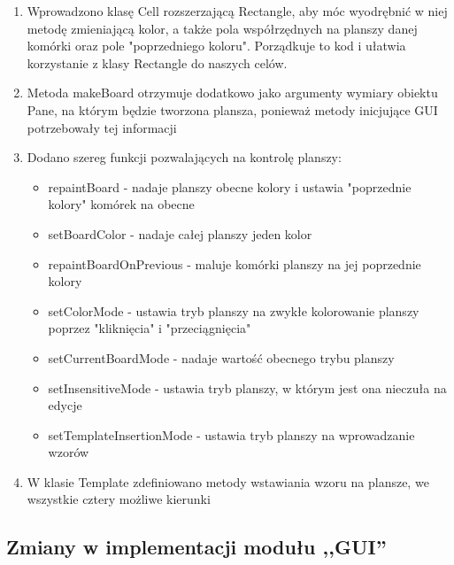 \documentclass[a4paper,11pt]{article}
\begin{document}
\begin{enumerate}
\item Wprowadzono klasę Cell rozszerzającą Rectangle, aby móc wyodrębnić w niej metodę zmieniającą kolor, a także pola współrzędnych na planszy danej komórki oraz pole "poprzedniego koloru". Porządkuje to kod i ułatwia korzystanie z klasy Rectangle do naszych celów.
\item Metoda makeBoard otrzymuje dodatkowo jako argumenty wymiary obiektu Pane, na którym będzie tworzona plansza, ponieważ metody inicjujące GUI potrzebowały tej informacji
\item Dodano szereg funkcji pozwalających na kontrolę planszy:
	\begin{itemize}
	\item repaintBoard - nadaje planszy obecne kolory i ustawia "poprzednie kolory" komórek na obecne
	\item setBoardColor - nadaje całej planszy jeden kolor
	\item repaintBoardOnPrevious - maluje komórki planszy na jej poprzednie kolory
	\item setColorMode - ustawia tryb planszy na zwykłe kolorowanie planszy poprzez "kliknięcia" i "przeciągnięcia"
	\item setCurrentBoardMode - nadaje wartość obecnego trybu planszy
	\item setInsensitiveMode - ustawia tryb planszy, w którym jest ona nieczuła na edycje
	\item setTemplateInsertionMode - ustawia tryb planszy na wprowadzanie wzorów
	\end{itemize}

\item W klasie Template zdefiniowano metody wstawiania wzoru na plansze, we wszystkie cztery możliwe kierunki

\end{enumerate}


\subsection{Zmiany w implementacji modułu ,,GUI''}
\end{document}
